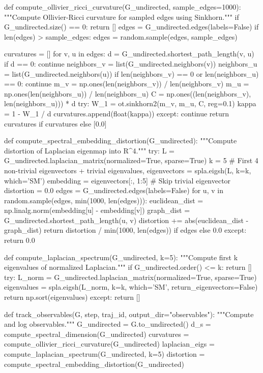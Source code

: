 \documentclass[11pt, a4paper]{article}
\begin{document}
def compute_ollivier_ricci_curvature(G_undirected, sample_edges=1000):
    """Compute Ollivier-Ricci curvature for sampled edges using Sinkhorn."""
    if G_undirected.size() == 0:
        return []
    edges = G_undirected.edges(labels=False)
    if len(edges) > sample_edges:
        edges = random.sample(edges, sample_edges)
    
    curvatures = []
    for v, u in edges:
        d = G_undirected.shortest_path_length(v, u)
        if d == 0:
            continue
        neighbors_v = list(G_undirected.neighbors(v))
        neighbors_u = list(G_undirected.neighbors(u))
        if len(neighbors_v) == 0 or len(neighbors_u) == 0:
            continue
        m_v = np.ones(len(neighbors_v)) / len(neighbors_v)
        m_u = np.ones(len(neighbors_u)) / len(neighbors_u)
        C = np.ones((len(neighbors_v), len(neighbors_u))) * d
        try:
            W_1 = ot.sinkhorn2(m_v, m_u, C, reg=0.1)
            kappa = 1 - W_1 / d
            curvatures.append(float(kappa))
        except:
            continue
    return curvatures if curvatures else [0.0]

def compute_spectral_embedding_distortion(G_undirected):
    """Compute distortion of Laplacian eigenmap into R^4."""
    try:
        L = G_undirected.laplacian_matrix(normalized=True, sparse=True)
        k = 5  # First 4 non-trivial eigenvectors + trivial
        eigenvalues, eigenvectors = spla.eigsh(L, k=k, which='SM')
        embedding = eigenvectors[:, 1:5]  # Skip trivial eigenvector
        distortion = 0.0
        edges = G_undirected.edges(labels=False)
        for u, v in random.sample(edges, min(1000, len(edges))):
            euclidean_dist = np.linalg.norm(embedding[u] - embedding[v])
            graph_dist = G_undirected.shortest_path_length(u, v)
            distortion += abs(euclidean_dist - graph_dist)
        return distortion / min(1000, len(edges)) if edges else 0.0
    except:
        return 0.0

def compute_laplacian_spectrum(G_undirected, k=5):
    """Compute first k eigenvalues of normalized Laplacian."""
    if G_undirected.order() <= k:
        return []
    try:
        L_norm = G_undirected.laplacian_matrix(normalized=True, sparse=True)
        eigenvalues = spla.eigsh(L_norm, k=k, which='SM', return_eigenvectors=False)
        return np.sort(eigenvalues)
    except:
        return []

def track_observables(G, step, traj_id, output_dir="observables"):
    """Compute and log observables."""
    G_undirected = G.to_undirected()
    d_s = compute_spectral_dimension(G_undirected)
    curvatures = compute_ollivier_ricci_curvature(G_undirected)
    laplacian_eigs = compute_laplacian_spectrum(G_undirected, k=5)
    distortion = compute_spectral_embedding_distortion(G_undirected)
    
\end{document}
